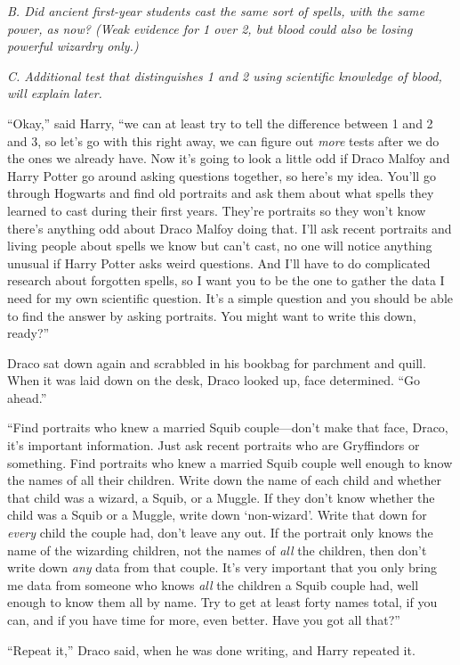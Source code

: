 \emph{B. Did ancient first-year students cast the same sort of spells,
with the same power, as now? (Weak evidence for 1 over 2, but blood
could also be losing powerful wizardry only.)}

\emph{C. Additional test that distinguishes 1 and 2 using scientific
knowledge of blood, will explain later.}

``Okay,'' said Harry, ``we can at least try to tell the difference
between 1 and 2 and 3, so let's go with this right away, we can figure
out \emph{more} tests after we do the ones we already have. Now it's
going to look a little odd if Draco Malfoy and Harry Potter go around
asking questions together, so here's my idea. You'll go through Hogwarts
and find old portraits and ask them about what spells they learned to
cast during their first years. They're portraits so they won't know
there's anything odd about Draco Malfoy doing that. I'll ask recent
portraits and living people about spells we know but can't cast, no one
will notice anything unusual if Harry Potter asks weird questions. And
I'll have to do complicated research about forgotten spells, so I want
you to be the one to gather the data I need for my own scientific
question. It's a simple question and you should be able to find the
answer by asking portraits. You might want to write this down, ready?''

Draco sat down again and scrabbled in his bookbag for parchment and
quill. When it was laid down on the desk, Draco looked up, face
determined. ``Go ahead.''

``Find portraits who knew a married Squib couple---don't make that face,
Draco, it's important information. Just ask recent portraits who are
Gryffindors or something. Find portraits who knew a married Squib couple
well enough to know the names of all their children. Write down the name
of each child and whether that child was a wizard, a Squib, or a Muggle.
If they don't know whether the child was a Squib or a Muggle, write down
`non-wizard'. Write that down for \emph{every} child the couple had,
don't leave any out. If the portrait only knows the name of the
wizarding children, not the names of \emph{all} the children, then don't
write down \emph{any} data from that couple. It's very important that
you only bring me data from someone who knows \emph{all} the children a
Squib couple had, well enough to know them all by name. Try to get at
least forty names total, if you can, and if you have time for more, even
better. Have you got all that?''

``Repeat it,'' Draco said, when he was done writing, and Harry repeated
it.

